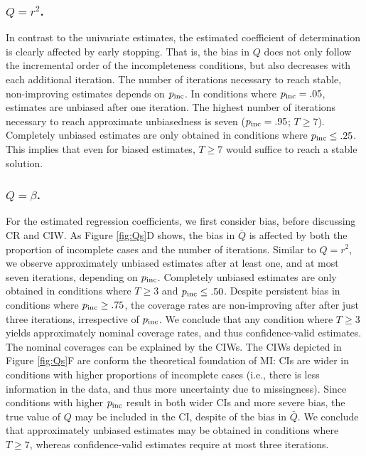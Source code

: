 \documentclass[Royal,times,sageh]{sagej}
\begin{document}
\hypertarget{qr2.}{%
\subsubsection{\texorpdfstring{\(Q=r^2\).}{Q=r\^{}2.}}\label{qr2.}}

In contrast to the univariate estimates, the estimated coefficient of determination is clearly affected by early stopping. That is, the bias in \(Q\) does not only follow the incremental order of the incompleteness conditions, but also decreases with each additional iteration. The number of iterations necessary to reach stable, non-improving estimates depends on \(p_{\rm inc}\). In conditions where \(p_{\rm inc}=.05\), estimates are unbiased after one iteration. The highest number of iterations necessary to reach approximate unbiasedness is seven (\(p_{\rm inc}=.95\); \(T\geq7\)). Completely unbiased estimates are only obtained in conditions where \(p_{\rm inc}\leq.25\). This implies that even for biased estimates, \(T\geq7\) would suffice to reach a stable solution.

\hypertarget{qbeta.}{%
\subsubsection{\texorpdfstring{\(Q=\beta\).}{Q=\textbackslash beta.}}\label{qbeta.}}

For the estimated regression coefficients, we first consider bias, before discussing CR and CIW. As Figure \ref{fig:Qs}D shows, the bias in \(\bar{Q}\) is affected by both the proportion of incomplete cases and the number of iterations. Similar to \(Q=r^2\), we observe approximately unbiased estimates after at least one, and at most seven iterations, depending on \(p_{\rm inc}\). Completely unbiased estimates are only obtained in conditions where \(T\geq3\) and \(p_{\rm inc}\leq .50\). Despite persistent bias in conditions where \(p_{\rm inc}\geq.75\), the coverage rates are non-improving after after just three iterations, irrespective of \(p_{\rm inc}\). We conclude that any condition where \(T\geq3\) yields approximately nominal coverage rates, and thus confidence-valid estimates.
The nominal coverages can be explained by the CIWs. The CIWs depicted in Figure \ref{fig:Qs}F are conform the theoretical foundation of MI: CIs are wider in conditions with higher proportions of incomplete cases (i.e., there is less information in the data, and thus more uncertainty due to missingness). Since conditions with higher \(p_{\rm inc}\) result in both wider CIs and more severe bias, the true value of \(Q\) may be included in the CI, despite of the bias in \(\bar{Q}\).
We conclude that approximately unbiased estimates may be obtained in conditions where \(T\geq7\), whereas confidence-valid estimates require at most three iterations. \newline
\end{document}
